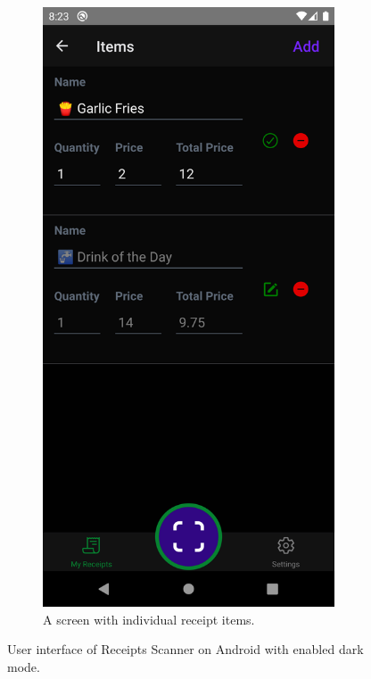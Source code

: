 \documentclass[
  digital, %
  table,   %
  oneside, %
  lof,     %
  lot,     %
]{fithesis3}
\begin{document}
\begin{figure}
\begin{subfigure}[t]{0.5\textwidth}
    \end{subfigure}
    \begin{subfigure}[t]{0.5\textwidth}
      \centering
      \includegraphics[width=0.95\textwidth]{figures/screens/android/dark/items}
      \caption{A screen with individual receipt items.}
      \label{fig:dark_mode_android}
    \end{subfigure}
    \caption{User interface of Receipts Scanner on Android with enabled dark mode.}
\end{figure}
\end{document}
